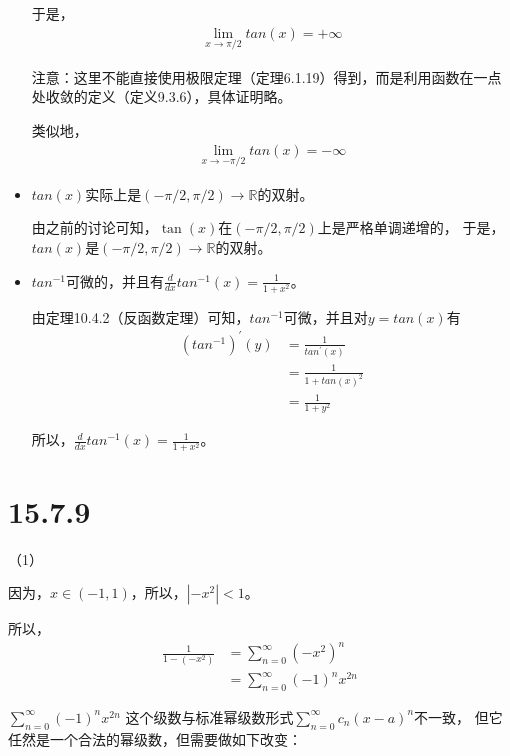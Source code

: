 \documentclass{article}
\begin{document}
\begin{itemize}
        于是，
        \begin{align*}
          \lim\limits_{x \to \pi/2} tan(x) = +\infty
        \end{align*}

        注意：这里不能直接使用极限定理（定理6.1.19）得到，而是利用函数在一点处收敛的定义（定义9.3.6），具体证明略。

        类似地，
        \begin{align*}
          \lim\limits_{x \to -\pi/2} tan(x) = -\infty
        \end{align*}

  \item $tan(x)$实际上是$(-\pi/2, \pi/2) \to \mathbb{R}$的双射。

        由之前的讨论可知，$\tan(x)$在$(-\pi/2, \pi/2)$上是严格单调递增的，
        于是，$tan(x)$是$(-\pi/2, \pi/2) \to \mathbb{R}$的双射。

  \item $tan^{-1}$可微的，并且有$\frac{d}{dx} tan^{-1}(x) = \frac{1}{1 + x^2}$。

        由定理10.4.2（反函数定理）可知，$tan^{-1}$可微，并且对$y = tan(x)$有
        \begin{align*}
          (tan^{-1})^\prime(y) & = \frac{1}{tan^\prime(x)} \\
                               & = \frac{1}{1 + tan(x)^2}  \\
                               & = \frac{1}{1 + y^2}
        \end{align*}

        所以，$\frac{d}{dx} tan^{-1}(x) = \frac{1}{1 + x^2}$。
\end{itemize}

\section*{15.7.9}

（1）

因为，$x \in (-1, 1)$，所以，$|-x^2| < 1$。

所以，
\begin{align*}
  \frac{1}{1 - (- x^2)} & = \sum \limits_{n = 0}^{\infty} (- x^2)^n     \\
                        & = \sum \limits_{n = 0}^{\infty} (-1)^n x^{2n}
\end{align*}

$\sum \limits_{n = 0}^{\infty} (-1)^n x^{2n}$
这个级数与标准幂级数形式$\sum \limits_{n = 0}^{\infty} c_n(x - a)^n$不一致，
但它任然是一个合法的幂级数，但需要做如下改变：
\end{document}
